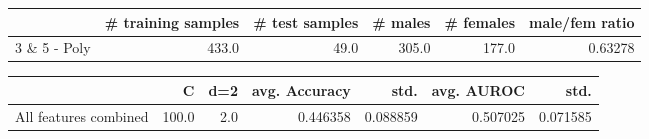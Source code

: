 \begin{tabular}{lrrrrr}
\hline
{} &  \# training samples &  \# test samples &  \# males &  \# females &  male/fem ratio \\
\hline
3 \& 5 - Poly &               433.0 &            49.0 &    305.0 &      177.0 &         0.63278 \\
\hline
\end{tabular}
\begin{tabular}{lrrrrrr}
\hline
{} &      C &  d=2 &  avg. Accuracy &      std. &  avg. AUROC &      std. \\
\hline
All features combined &  100.0 &  2.0 &       0.446358 &  0.088859 &    0.507025 &  0.071585 \\
\hline
\end{tabular}

